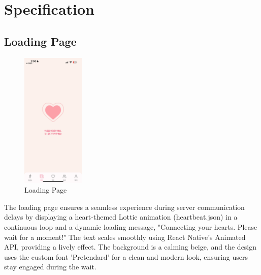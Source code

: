     \section{Specification}
   \subsection{Loading Page}
        \begin{figure}[htbp]
            \centerline{\includegraphics[width=3cm]{Images/page/loading.png}}
            \caption{Loading Page}
            \label{fig}
        \end{figure}

        The loading page ensures a seamless experience during server communication delays by displaying a heart-themed Lottie animation (heartbeat.json) in a continuous loop and a dynamic loading message, "Connecting your hearts. Please wait for a moment!" The text scales smoothly using React Native's Animated API, providing a lively effect. The background is a calming beige, and the design uses the custom font 'Pretendard' for a clean and modern look, ensuring users stay engaged during the wait.
        
